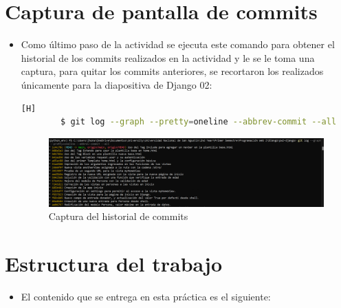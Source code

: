 \documentclass{article}
\begin{document}
    \section{Captura de pantalla de commits}
        \begin{itemize}
            \item Como último paso de la actividad se ejecuta este comando para obtener el historial de los commits realizados en la actividad y le se le toma una captura, para quitar los commits anteriores, se recortaron los realizados únicamente para la diapositiva de Django 02:
        \begin{lstlisting}[language=bash,caption={Historial de commits}][H]
        $ git log --graph --pretty=oneline --abbrev-commit --all
        \end{lstlisting}
        \begin{figure}[H]
            \centering
            \includegraphics[width=1\linewidth]{img/Captura.png}
            \caption{Captura del historial de commits}
            \label{fig:enter-label}
        \end{figure}
        \end{itemize}
    \clearpage
    
        
    \section{Estructura del trabajo}
        \begin{itemize}	
            \item El contenido que se entrega en esta práctica es el siguiente:
        \end{itemize}
\end{document}
